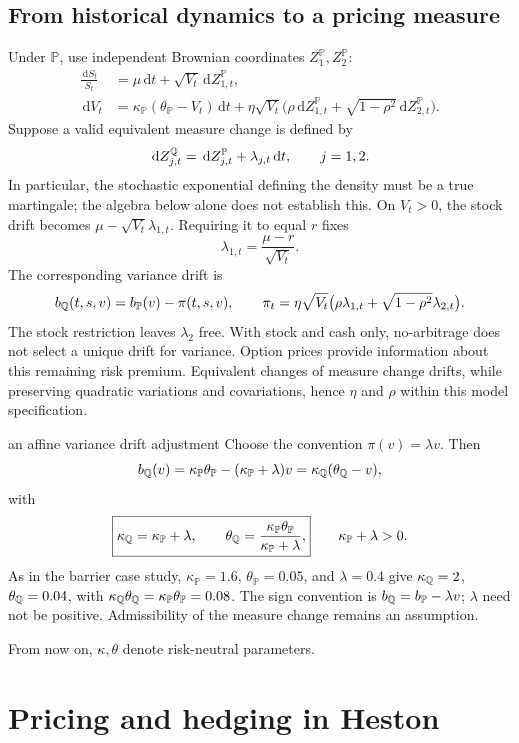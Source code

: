 \documentclass[10pt]{article}
\newcommand{\dd}{\,\mathrm d}\newcommand{\Pp}{\mathbb P}\newcommand{\Var}{\operatorname{Var}}\newcommand{\Cov}{\operatorname{Cov}}
\theoremstyle{definition}\newtheorem{definition}{Definition}[section]
\begin{document}
\subsection{From historical dynamics to a pricing measure}\label{sec:measures}
Under \(\Pp\), use independent Brownian coordinates
\(Z_1^\Pp,Z_2^\Pp\):
\[
\begin{aligned}
\frac{\dd S_t}{S_t}&=\mu\dd t+\sqrt{V_t}\dd Z_{1,t}^\Pp,\\
\dd V_t&=\kappa_\Pp(\theta_\Pp-V_t)\dd t
+\eta\sqrt{V_t}\bigl(\rho\dd Z_{1,t}^\Pp+\sqrt{1-\rho^2}\dd Z_{2,t}^\Pp\bigr).
\end{aligned}
\]
Suppose a valid equivalent measure change is defined by
\[
\dd Z_{j,t}^\Q=\dd Z_{j,t}^\Pp+\lambda_{j,t}\dd t,\qquad j=1,2.
\]
In particular, the stochastic exponential defining the density must be
a true martingale; the algebra below alone does not establish this.
On \(V_t>0\), the stock drift becomes \(\mu-\sqrt{V_t}\lambda_{1,t}\).
Requiring it to equal \(r\) fixes
\[
\boxed{\lambda_{1,t}=\frac{\mu-r}{\sqrt{V_t}}.}
\]
The corresponding variance drift is
\[
b_\Q(t,s,v)=b_\Pp(v)-\pi(t,s,v),\qquad
\pi_t=\eta\sqrt{V_t}
\bigl(\rho\lambda_{1,t}+\sqrt{1-\rho^2}\lambda_{2,t}\bigr).
\]
The stock restriction leaves \(\lambda_2\) free. With stock and cash only,
no-arbitrage does not select a unique drift for variance. Option prices
provide information about this remaining risk premium. Equivalent changes
of measure change drifts, while preserving quadratic variations and
covariations, hence \(\eta\) and \(\rho\) within this model specification.

\begin{boardexample}{an affine variance drift adjustment}
Choose the convention \(\pi(v)=\lambda v\). Then
\[
b_\Q(v)=\kappa_\Pp\theta_\Pp-(\kappa_\Pp+\lambda)v
=\kappa_\Q(\theta_\Q-v),
\]
with
\[
\boxed{\kappa_\Q=\kappa_\Pp+\lambda,\qquad
\theta_\Q=\frac{\kappa_\Pp\theta_\Pp}{\kappa_\Pp+\lambda},}
\qquad\kappa_\Pp+\lambda>0.
\]
As in the barrier case study, \(\kappa_\Pp=1.6\), \(\theta_\Pp=0.05\), and
\(\lambda=0.4\) give \(\kappa_\mathbb Q=2\), \(\theta_\mathbb Q=0.04\), with
\(\kappa_\Q\theta_\Q=\kappa_\Pp\theta_\Pp=0.08\). The sign convention is
\(b_\Q=b_\Pp-\lambda v\); \(\lambda\) need not be positive. Admissibility
of the measure change remains an assumption.
\end{boardexample}
From now on, \(\kappa,\theta\) denote risk-neutral parameters.

\section{Pricing and hedging in Heston}
\end{document}
